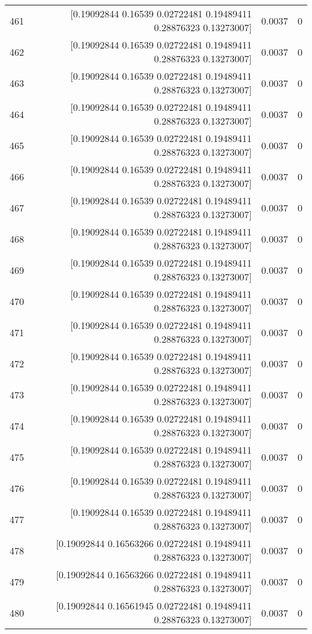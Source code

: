 \begin{longtable}{lrrr}
461 & [0.19092844 0.16539    0.02722481 0.19489411 0.28876323 0.13273007] & 0.0037 & 0 \\
462 & [0.19092844 0.16539    0.02722481 0.19489411 0.28876323 0.13273007] & 0.0037 & 0 \\
463 & [0.19092844 0.16539    0.02722481 0.19489411 0.28876323 0.13273007] & 0.0037 & 0 \\
464 & [0.19092844 0.16539    0.02722481 0.19489411 0.28876323 0.13273007] & 0.0037 & 0 \\
465 & [0.19092844 0.16539    0.02722481 0.19489411 0.28876323 0.13273007] & 0.0037 & 0 \\
466 & [0.19092844 0.16539    0.02722481 0.19489411 0.28876323 0.13273007] & 0.0037 & 0 \\
467 & [0.19092844 0.16539    0.02722481 0.19489411 0.28876323 0.13273007] & 0.0037 & 0 \\
468 & [0.19092844 0.16539    0.02722481 0.19489411 0.28876323 0.13273007] & 0.0037 & 0 \\
469 & [0.19092844 0.16539    0.02722481 0.19489411 0.28876323 0.13273007] & 0.0037 & 0 \\
470 & [0.19092844 0.16539    0.02722481 0.19489411 0.28876323 0.13273007] & 0.0037 & 0 \\
471 & [0.19092844 0.16539    0.02722481 0.19489411 0.28876323 0.13273007] & 0.0037 & 0 \\
472 & [0.19092844 0.16539    0.02722481 0.19489411 0.28876323 0.13273007] & 0.0037 & 0 \\
473 & [0.19092844 0.16539    0.02722481 0.19489411 0.28876323 0.13273007] & 0.0037 & 0 \\
474 & [0.19092844 0.16539    0.02722481 0.19489411 0.28876323 0.13273007] & 0.0037 & 0 \\
475 & [0.19092844 0.16539    0.02722481 0.19489411 0.28876323 0.13273007] & 0.0037 & 0 \\
476 & [0.19092844 0.16539    0.02722481 0.19489411 0.28876323 0.13273007] & 0.0037 & 0 \\
477 & [0.19092844 0.16539    0.02722481 0.19489411 0.28876323 0.13273007] & 0.0037 & 0 \\
478 & [0.19092844 0.16563266 0.02722481 0.19489411 0.28876323 0.13273007] & 0.0037 & 0 \\
479 & [0.19092844 0.16563266 0.02722481 0.19489411 0.28876323 0.13273007] & 0.0037 & 0 \\
480 & [0.19092844 0.16561945 0.02722481 0.19489411 0.28876323 0.13273007] & 0.0037 & 0 \\

\end{longtable}
